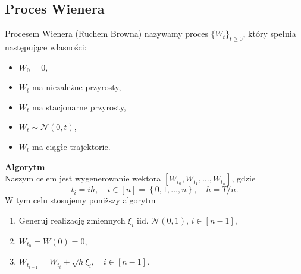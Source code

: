 \documentclass[12pt]{mwrep}
\begin{document}
	\subsection{Proces Wienera}
	\noindent Procesem Wienera (Ruchem Browna) nazywamy proces $\{W_t\}_{t\geqslant0}$, który spełnia następujące własności:
	\begin{itemize}[leftmargin=10mm, label=\small$\bullet$]%
		\item $W_0=0$,
		\item $W_t$ ma niezależne przyrosty,
		\item $W_t$ ma stacjonarne przyrosty,
		\item $W_t \sim \mathcal{N}(0, t)$,
		\item $W_t$ ma ciągłe trajektorie.
	\end{itemize}	
	\noindent \textbf{Algorytm}\\
	\noindent Naszym celem jest wygenerowanie wektora $\left[W_{t_0}, W_{t_1}, \dots, W_{t_n}\right]$, gdzie
	\begin{equation*}
		t_i=ih, \quad i\in\left[n\right]=\left\{0, 1, \dots, n\right\}, \quad h=T/n.
	\end{equation*}
	W tym celu stosujemy poniższy algorytm
	\begin{enumerate}[leftmargin=10mm]
		\item Generuj realizację zmiennych $\xi_i\text{ iid. }\mathcal{N}(0,1), \,i\in\left[n-1\right]$,
		\item $W_{t_0}=W\left(0\right)=0$,
		\item $W_{t_{i+1}} = W_{t_{i}}+\sqrt{h}\xi_i,\quad i\in\left[n-1\right].$%
	\end{enumerate}
\end{document}
